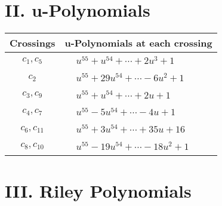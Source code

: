 \documentclass[1p]{elsarticle_modified}
\theoremstyle{definition}
\begin{document}
\newpage\renewcommand{\arraystretch}{1}
\centering \section*{ II. u-Polynomials}
\begin{tabular}{m{50pt}|m{274pt}}
Crossings & \hspace{64pt}u-Polynomials at each crossing \\
\hline $$\begin{aligned}c_{1},c_{5}\end{aligned}$$&$\begin{aligned}
&u^{55}+u^{54}+\cdots+2 u^3+1
\end{aligned}$\\
\hline $$\begin{aligned}c_{2}\end{aligned}$$&$\begin{aligned}
&u^{55}+29 u^{54}+\cdots-6 u^2+1
\end{aligned}$\\
\hline $$\begin{aligned}c_{3},c_{9}\end{aligned}$$&$\begin{aligned}
&u^{55}+u^{54}+\cdots+2 u+1
\end{aligned}$\\
\hline $$\begin{aligned}c_{4},c_{7}\end{aligned}$$&$\begin{aligned}
&u^{55}-5 u^{54}+\cdots-4 u+1
\end{aligned}$\\
\hline $$\begin{aligned}c_{6},c_{11}\end{aligned}$$&$\begin{aligned}
&u^{55}+3 u^{54}+\cdots+35 u+16
\end{aligned}$\\
\hline $$\begin{aligned}c_{8},c_{10}\end{aligned}$$&$\begin{aligned}
&u^{55}-19 u^{54}+\cdots-18 u^2+1
\end{aligned}$\\
\hline
\end{tabular}\newpage\renewcommand{\arraystretch}{1}
\centering \section*{ III. Riley Polynomials}
\end{document}
